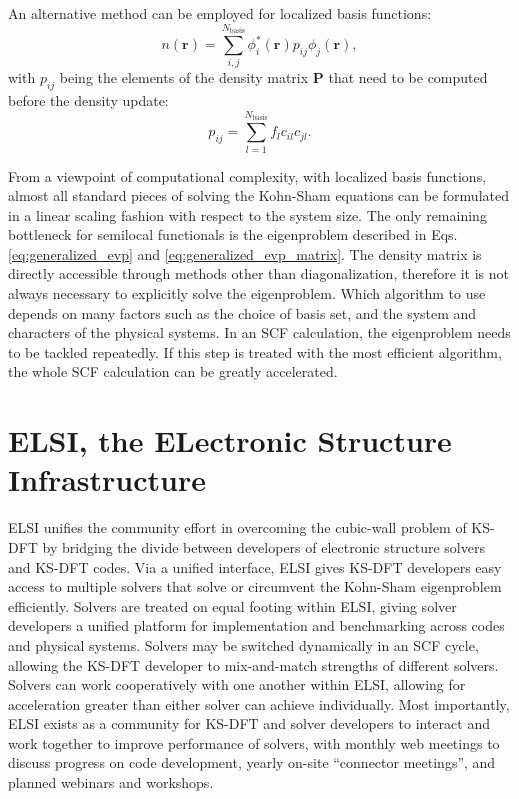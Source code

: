 \documentclass{report}
\begin{document}
An alternative method can be employed for localized basis functions:
\begin{equation}
\label{eq:density_matrix_update}
n(\boldsymbol{r}) = \sum_{i,j}^{N_\text{basis}} \phi_i^*(\boldsymbol{r}) p_{ij} \phi_j(\boldsymbol{r}) ,
\end{equation}
with $p_{ij}$ being the elements of the density matrix $\boldsymbol{P}$ that need to be computed before the density update:
\begin{equation}
\label{eq:density_matrix}
p_{ij} = \sum_{l=1}^{N_\text{basis}} f_l c_{il} c_{jl} .
\end{equation}

From a viewpoint of computational complexity, with localized basis functions, almost all standard pieces of solving the Kohn-Sham equations can be formulated in a linear scaling fashion with respect to the system size.  The only remaining bottleneck for semilocal functionals is the eigenproblem described in Eqs. \ref{eq:generalized_evp} and \ref{eq:generalized_evp_matrix}.  The density matrix is directly accessible through methods other than diagonalization, therefore it is not always necessary to explicitly solve the eigenproblem.  Which algorithm to use depends on many factors such as the choice of basis set, and the system and characters of the physical systems.  In an SCF calculation, the eigenproblem needs to be tackled repeatedly.  If this step is treated with the most efficient algorithm, the whole SCF calculation can be greatly accelerated.

\section{ELSI, the ELectronic Structure Infrastructure}
\label{sec:elsi}
ELSI unifies the community effort in overcoming the cubic-wall problem of KS-DFT by bridging the divide between developers of electronic structure solvers and KS-DFT codes.  Via a unified interface, ELSI gives KS-DFT developers easy access to multiple solvers that solve or circumvent the Kohn-Sham eigenproblem efficiently.  Solvers are treated on equal footing within ELSI, giving solver developers a unified platform for implementation and benchmarking across codes and physical systems.  Solvers may be switched dynamically in an SCF cycle, allowing the KS-DFT developer to mix-and-match strengths of different solvers.  Solvers can work cooperatively with one another within ELSI, allowing for acceleration greater than either solver can achieve individually.  Most importantly, ELSI exists as a community for KS-DFT and solver developers to interact and work together to improve performance of solvers, with monthly web meetings to discuss progress on code development, yearly on-site ``connector meetings'', and planned webinars and workshops.
\end{document}
